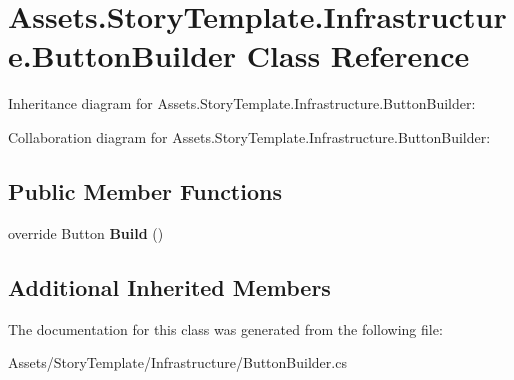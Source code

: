 \hypertarget{classAssets_1_1StoryTemplate_1_1Infrastructure_1_1ButtonBuilder}{}\section{Assets.\+Story\+Template.\+Infrastructure.\+Button\+Builder Class Reference}
\label{classAssets_1_1StoryTemplate_1_1Infrastructure_1_1ButtonBuilder}


Inheritance diagram for Assets.\+Story\+Template.\+Infrastructure.\+Button\+Builder\+:


Collaboration diagram for Assets.\+Story\+Template.\+Infrastructure.\+Button\+Builder\+:
\subsection*{Public Member Functions}
\begin{DoxyCompactItemize}
\item 
override Button {\bfseries Build} ()\hypertarget{classAssets_1_1StoryTemplate_1_1Infrastructure_1_1ButtonBuilder_afe475a7d2a6c7bd658826edd86167862}{}\label{classAssets_1_1StoryTemplate_1_1Infrastructure_1_1ButtonBuilder_afe475a7d2a6c7bd658826edd86167862}

\end{DoxyCompactItemize}
\subsection*{Additional Inherited Members}


The documentation for this class was generated from the following file\+:\begin{DoxyCompactItemize}
\item 
Assets/\+Story\+Template/\+Infrastructure/Button\+Builder.\+cs\end{DoxyCompactItemize}
